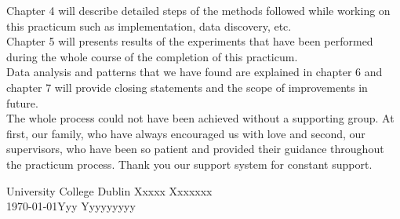 Chapter 4 will describe detailed steps of the methods followed while working on this practicum such as implementation, data discovery, etc.\\

Chapter 5 will presents results of the experiments that have been performed during the whole course of the completion of this practicum.\\

Data analysis and patterns that we have found are explained in chapter 6 and chapter 7 will provide closing statements and the scope of improvements in future.\\

The whole process could not have been achieved without a supporting group. At first, our family, who have always encouraged us with love and second, our supervisors, who have been so patient and provided their guidance throughout the practicum process. Thank you our support system for constant support.


\vspace{2em}

University College Dublin \hfill Xxxxx Xxxxxxx \\
\today \hfill Yyy Yyyyyyyyy
